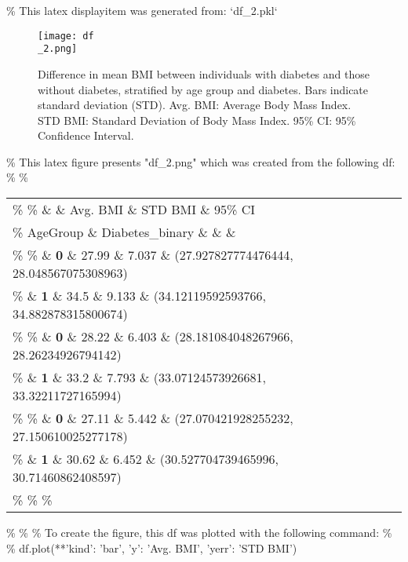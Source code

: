 \documentclass[11pt]{article}
\begin{document}
\begin{codeoutput}
\% This latex displayitem was generated from: `df\_2.pkl`

\begin{figure}[htbp]
\centering
\texttt{[image: df\\\_2.png]}
\caption{Difference in mean BMI between individuals with diabetes and those without diabetes, stratified by age group and diabetes.
Bars indicate standard deviation (STD). 
Avg. BMI: Average Body Mass Index. 
STD BMI: Standard Deviation of Body Mass Index. 
95\% CI: 95\% Confidence Interval. }
\label{figure:df\_2}
\end{figure}
\% This latex figure presents "df\_2.png" which was created from the following df:
\% 
\% \begin{tabular}{llrrl}
\% \toprule
\%  \&  \& Avg. BMI \& STD BMI \& 95\% CI \\
\% AgeGroup \& Diabetes\_binary \&  \&  \&  \\
\% \midrule
\% \multirow[t]{2}{*}{\textbf{Young}} \& \textbf{0} \& 27.99 \& 7.037 \& (27.927827774476444, 28.048567075308963) \\
\% \textbf{} \& \textbf{1} \& 34.5 \& 9.133 \& (34.12119592593766, 34.882878315800674) \\
\% \cline{1-5}
\% \multirow[t]{2}{*}{\textbf{Middle-aged}} \& \textbf{0} \& 28.22 \& 6.403 \& (28.181084048267966, 28.26234926794142) \\
\% \textbf{} \& \textbf{1} \& 33.2 \& 7.793 \& (33.07124573926681, 33.32211727165994) \\
\% \cline{1-5}
\% \multirow[t]{2}{*}{\textbf{Old}} \& \textbf{0} \& 27.11 \& 5.442 \& (27.070421928255232, 27.150610025277178) \\
\% \textbf{} \& \textbf{1} \& 30.62 \& 6.452 \& (30.527704739465996, 30.71460862408597) \\
\% \cline{1-5}
\% \bottomrule
\% \end{tabular}
\% 
\% 
\% To create the figure, this df was plotted with the following command:
\% 
\% df.plot(**{'kind': 'bar', 'y': 'Avg. BMI', 'yerr': 'STD BMI'})
\end{codeoutput}
\end{document}
